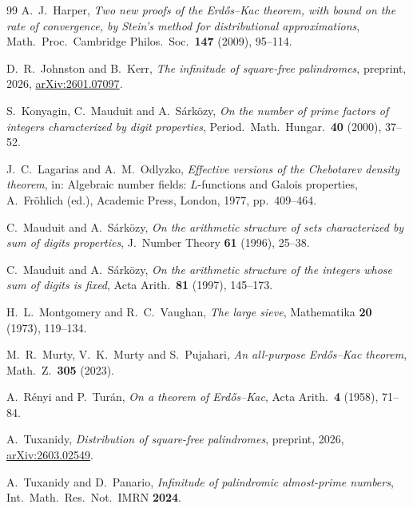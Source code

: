 \documentclass[11pt,a4paper]{article}
\theoremstyle{plain}
\theoremstyle{definition}
\numberwithin{equation}{section}
\begin{document}
\begin{thebibliography}{99}
 A.~J.~Harper, \emph{Two new proofs of the Erd\H os--Kac theorem, with bound on the rate of
convergence, by Stein's method for distributional approximations}, Math.\ Proc.\ Cambridge Philos.\ Soc.\
\textbf{147} (2009), 95--114.

 D.~R.~Johnston and B.~Kerr, \emph{The infinitude of square-free palindromes},
preprint, 2026, \href{https://arxiv.org/abs/2601.07097}{arXiv:2601.07097}.

 S.~Konyagin, C.~Mauduit and A.~S\'ark\"ozy, \emph{On the number of prime factors of
integers characterized by digit properties}, Period.\ Math.\ Hungar.\ \textbf{40} (2000), 37--52.

 J.~C.~Lagarias and A.~M.~Odlyzko, \emph{Effective versions of the Chebotarev density
theorem}, in: Algebraic number fields: $L$-functions and Galois properties, A.~Fr\"ohlich (ed.),
Academic Press, London, 1977,
pp.\ 409--464.

 C.~Mauduit and A.~S\'ark\"ozy, \emph{On the arithmetic structure of sets characterized
by sum of digits properties}, J.\ Number Theory \textbf{61} (1996), 25--38.

 C.~Mauduit and A.~S\'ark\"ozy, \emph{On the arithmetic structure of the integers whose
sum of digits is fixed}, Acta Arith.\ \textbf{81} (1997), 145--173.

 H.~L.~Montgomery and R.~C.~Vaughan, \emph{The large sieve},
Mathematika \textbf{20} (1973), 119--134.

 M.~R.~Murty, V.~K.~Murty and S.~Pujahari, \emph{An all-purpose Erd\H os--Kac theorem},
Math.\ Z.\ \textbf{305} (2023).

 A.~R\'enyi and P.~Tur\'an, \emph{On a theorem of Erd\H os--Kac}, Acta Arith.\ \textbf{4}
(1958), 71--84.

 A.~Tuxanidy, \emph{Distribution of square-free palindromes}, preprint, 2026,
\href{https://arxiv.org/abs/2603.02549}{arXiv:2603.02549}.

 A.~Tuxanidy and D.~Panario, \emph{Infinitude of palindromic almost-prime numbers},
Int.\ Math.\ Res.\ Not.\ IMRN \textbf{2024}.

\end{thebibliography}
\end{document}
